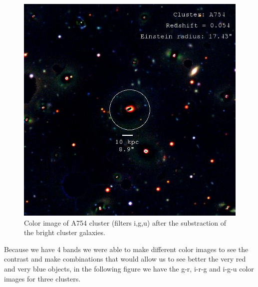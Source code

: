 \begin{figure}[H]
\centering
\includegraphics[width=12cm]{images/cA754_galfit.jpg}
\caption[Color image of A754 after fitting the bright objects]{Color image of A754 cluster (filters i,g,u) after the substraction of the bright cluster galaxies.}
\end{figure}

Because we have 4 bands we were able to make different color images to see the contrast and make combinations that would allow us to see better the very red and very blue objects, in the following figure we have the g-r, i-r-g and i-g-u color images for three clusters. 

